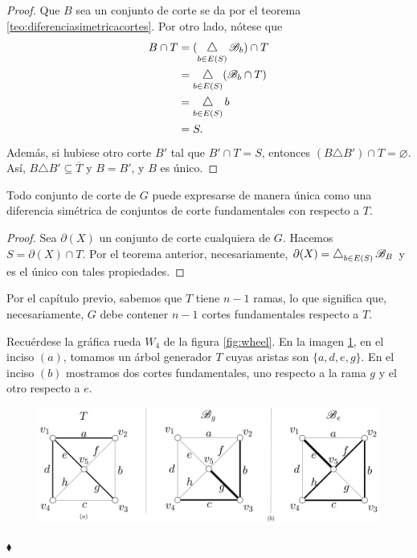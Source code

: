 \begin{proof}
Que $B$ sea un conjunto de corte se da por el teorema \ref{teo:diferenciasimetricacortes}. Por otro lado, nótese que
\begin{align*}
    B \cap T &=(\difsym_{b \in E(S)} \mathscr{B}_{b}) \cap T \\
             &=\difsym_{b \in E(S)} (\mathscr{B}_{b} \cap T) \\
             &=\difsym_{b\in E(S)} b \\
             &= S.
\end{align*}
Además, si hubiese otro corte $B'$ tal que $B' \cap T= S$, entonces $(B \triangle B') \cap T = \varnothing$. Así, $B \triangle B' \subseteq \overline{T}$ y $B = B'$, y $B$ es único.

\end{proof}

\begin{cor} \label{basecortesfundamentales}
Todo conjunto de corte de $G$ puede expresarse de manera única como una diferencia simétrica de conjuntos de corte fundamentales con respecto a $T$.
\end{cor}

\begin{proof}
Sea $\partial(X)$ un conjunto de corte cualquiera de $G$. Hacemos $S= \partial(X) \cap T$. Por el teorema anterior, necesariamente, $\partial(X) = \difsym_{b \in E(S)} \mathscr{B}_{B}$ y es el único con tales propiedades.

\end{proof}

Por el capítulo previo, sabemos que $T$ tiene $n-1$ ramas, lo que significa que, necesariamente, $G$ debe contener $n-1$ cortes fundamentales respecto a $T$.

\begin{ejem} \label{ejem:cortesfundamentales}
Recuérdese la gráfica rueda $W_{4}$ de la figura \ref{fig:wheel}. En la imagen \ref{fig:bondminimales}, en el inciso $(a)$, tomamos un árbol generador $T$ cuyas aristas son $\{a, d, e, g\}$. En el inciso $(b)$ mostramos dos cortes fundamentales, uno respecto a la rama $g$ y el otro respecto a $e$.

\begin{figure}[t]
    \centering
    \includegraphics[scale = 0.15]{img/imgchapter2/bondminimales.jpg}
    \caption{}
    \label{fig:bondminimales}
\end{figure}

\hfill $\blacklozenge$
\end{ejem}



